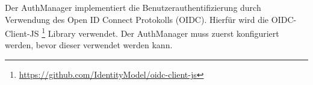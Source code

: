 Der AuthManager implementiert die Benutzerauthentifizierung durch Verwendung des Open ID Connect Protokolls (OIDC).
Hierfür wird die OIDC-Client-JS \footnote{\href{https://github.com/IdentityModel/oidc-client-js}{https://github.com/IdentityModel/oidc-client-js}} Library verwendet.
Der AuthManager muss zuerst konfiguriert werden, bevor dieser verwendet werden kann.